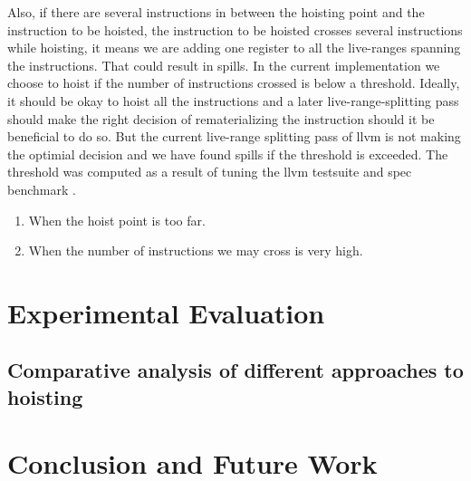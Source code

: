 \documentclass{sig-alternate}
\begin{document}
Also, if there are several instructions in between the hoisting point and the
instruction to be hoisted, the instruction to be hoisted crosses several
instructions while hoisting, it means we are adding one register to all the
live-ranges spanning the instructions. That could result in spills. In the
current implementation we choose to hoist if the number of instructions crossed
is below a threshold. Ideally, it should be okay to hoist all the instructions
and a later live-range-splitting pass should make the right decision of
rematerializing the instruction should it be beneficial to do so. But the
current live-range splitting pass of llvm is not making the optimial decision
and we have found spills if the threshold is exceeded. The threshold was
computed as a result of tuning the llvm testsuite \cite{llvm-nightly} and spec
benchmark \cite{Henning2000}.

\begin{enumerate}
\item When the hoist point is too far.
\item When the number of instructions we may cross is very high.
\end{enumerate}



\newpage

\section{Experimental Evaluation}
\label{sec:experimental-results}

\subsection{Comparative analysis of different approaches to hoisting}


\section{Conclusion and Future Work}


{\small

}
\end{document}
